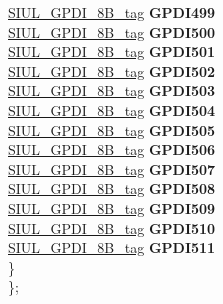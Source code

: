 \begin{DoxyCompactItemize}
\begin{tabbing}
\>\>\mbox{\hyperlink{unionSIUL__GPDI__8B__tag}{SIUL\_GPDI\_8B\_tag}} {\bfseries GPDI499}\\
\>\>\mbox{\hyperlink{unionSIUL__GPDI__8B__tag}{SIUL\_GPDI\_8B\_tag}} {\bfseries GPDI500}\\
\>\>\mbox{\hyperlink{unionSIUL__GPDI__8B__tag}{SIUL\_GPDI\_8B\_tag}} {\bfseries GPDI501}\\
\>\>\mbox{\hyperlink{unionSIUL__GPDI__8B__tag}{SIUL\_GPDI\_8B\_tag}} {\bfseries GPDI502}\\
\>\>\mbox{\hyperlink{unionSIUL__GPDI__8B__tag}{SIUL\_GPDI\_8B\_tag}} {\bfseries GPDI503}\\
\>\>\mbox{\hyperlink{unionSIUL__GPDI__8B__tag}{SIUL\_GPDI\_8B\_tag}} {\bfseries GPDI504}\\
\>\>\mbox{\hyperlink{unionSIUL__GPDI__8B__tag}{SIUL\_GPDI\_8B\_tag}} {\bfseries GPDI505}\\
\>\>\mbox{\hyperlink{unionSIUL__GPDI__8B__tag}{SIUL\_GPDI\_8B\_tag}} {\bfseries GPDI506}\\
\>\>\mbox{\hyperlink{unionSIUL__GPDI__8B__tag}{SIUL\_GPDI\_8B\_tag}} {\bfseries GPDI507}\\
\>\>\mbox{\hyperlink{unionSIUL__GPDI__8B__tag}{SIUL\_GPDI\_8B\_tag}} {\bfseries GPDI508}\\
\>\>\mbox{\hyperlink{unionSIUL__GPDI__8B__tag}{SIUL\_GPDI\_8B\_tag}} {\bfseries GPDI509}\\
\>\>\mbox{\hyperlink{unionSIUL__GPDI__8B__tag}{SIUL\_GPDI\_8B\_tag}} {\bfseries GPDI510}\\
\>\>\mbox{\hyperlink{unionSIUL__GPDI__8B__tag}{SIUL\_GPDI\_8B\_tag}} {\bfseries GPDI511}\\
\>\} \\
\}; \\


\end{tabbing}
\end{DoxyCompactItemize}
